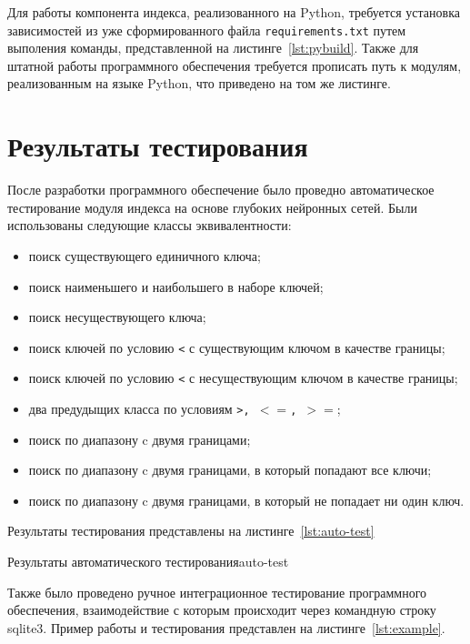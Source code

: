 
Для работы компонента индекса, реализованного на Python, требуется установка
зависимостей из уже сформированного файла \texttt{requirements.txt} путем
выполения команды, представленной на листинге~\ref{lst:pybuild}. Также для
штатной работы программного обеспечения требуется прописать путь к модулям,
реализованным на языке Python, что приведено на том же листинге.


\section{Результаты тестирования}

После разработки программного обеспечение было проведно автоматическое
тестирование модуля индекса на основе глубоких нейронных сетей. Были
использованы следующие классы эквивалентности:

\begin{itemize}
    \item поиск существующего единичного ключа;
    \item поиск наименьшего и наибольшего в наборе ключей;
    \item поиск несуществующего ключа;
    \item поиск ключей по условию \texttt{<} с существующим ключом в качестве
        границы;
    \item поиск ключей по условию \texttt{<} с несуществующим ключом в качестве
        границы;
    \item два предудыщих класса по условиям \texttt{>, $<=$, $>=$};
    \item поиск по диапазону c двумя границами;
    \item поиск по диапазону c двумя границами, в который попадают все ключи;
    \item поиск по диапазону c двумя границами, в который не попадает ни один
        ключ.
\end{itemize}

Результаты тестирования представлены на листинге~\ref{lst:auto-test}

{}{Результаты автоматического тестирования}{auto-test}{}

Также было проведено ручное интеграционное тестирование программного
обеспечения, взаимодействие с которым происходит через командную строку sqlite3.
Пример работы и тестирования представлен на листинге~\ref{lst:example}.

